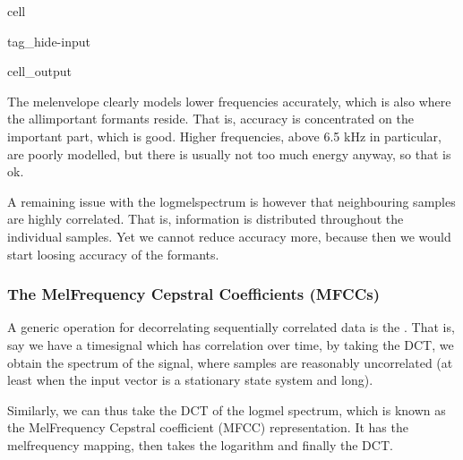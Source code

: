 \documentclass[letterpaper,10pt,english]{jupyterBook}
\begin{document}
\begin{sphinxuseclass}{cell}
\begin{sphinxuseclass}{tag_hide-input}\begin{sphinxVerbatimOutput}

\begin{sphinxuseclass}{cell_output}
\noindent{}

\noindent{}

\noindent{}

\end{sphinxuseclass}\end{sphinxVerbatimOutput}

\end{sphinxuseclass}
\end{sphinxuseclass}
\sphinxAtStartPar
The mel\sphinxhyphen{}envelope clearly models lower frequencies accurately, which is also where the all\sphinxhyphen{}important formants reside. That is, accuracy is concentrated on the important part, which is good. Higher frequencies, above 6.5 kHz in particular, are poorly modelled, but there is usually not too much energy anyway, so that is ok.

\sphinxAtStartPar
A remaining issue with the log\sphinxhyphen{}melspectrum is however that neighbouring samples are highly correlated. That is, information is distributed throughout the individual samples. Yet we cannot reduce accuracy more, because then we would start loosing accuracy of the formants.


\subsubsection{The Mel\sphinxhyphen{}Frequency Cepstral Coefficients (MFCCs)}
\label{\detokenize{Representations/Melcepstrum:the-mel-frequency-cepstral-coefficients-mfccs}}
\sphinxAtStartPar
A generic operation for decorrelating sequentially correlated data is the . That is, say we have a time\sphinxhyphen{}signal which has correlation over time, by taking the DCT, we obtain the spectrum of the signal, where samples are reasonably uncorrelated (at least when the input vector is a stationary state system and long).

\sphinxAtStartPar
Similarly, we can thus take the DCT of the log\sphinxhyphen{}mel spectrum, which is known as the Mel\sphinxhyphen{}Frequency Cepstral coefficient (MFCC) representation. It has the mel\sphinxhyphen{}frequency mapping, then takes the logarithm and finally the DCT.
\end{document}
